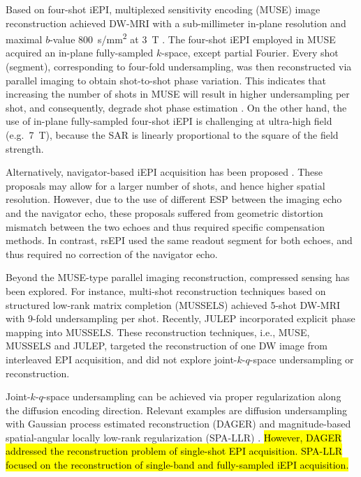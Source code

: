 \documentclass[preprint,12pt,authoryear,review]{elsarticle}
\begin{document}
    Based on four-shot iEPI,
    multiplexed sensitivity encoding (MUSE) image reconstruction
    achieved DW-MRI with a sub-millimeter in-plane resolution
    and maximal $b$-value \SI{800}{s/mm^2} at \SI{3}{\tesla}
    \citep{chen_2013_muse}.
    The four-shot iEPI employed in MUSE acquired
    an in-plane fully-sampled $k$-space, except partial Fourier.
    Every shot (segment), corresponding to four-fold undersampling,
    was then reconstructed via parallel imaging
    to obtain shot-to-shot phase variation.
    This indicates that increasing the number of shots in MUSE
    will result in higher undersampling per shot,
    and consequently, degrade shot phase estimation \citep{wu_2017_diff}.
    On the other hand, the use of in-plane fully-sampled four-shot iEPI
    is challenging at ultra-high field (e.g.~\SI{7}{\tesla}),
    because the SAR is linearly proportional
    to the square of the field strength.

    Alternatively, navigator-based iEPI acquisition has been proposed
    \citep{jeong_2013_navims,dai_2017_navi,dai_2018_navi}.
    These proposals may allow for a larger number of shots,
    and hence higher spatial resolution.
    However, due to the use of different ESP
    between the imaging echo and the navigator echo,
    these proposals suffered from geometric distortion mismatch
    between the two echoes and thus required specific compensation methods.
    In contrast, rsEPI \citep{porter_2009_resolve,heidemann_2010_resolve7t}
    used the same readout segment for both echoes,
    and thus required no correction of the navigator echo.

    Beyond the MUSE-type parallel imaging reconstruction,
    compressed sensing \citep{lustig_2007_cs,block_2007_cs}
    has been explored.
    For instance, multi-shot reconstruction techniques
    based on structured low-rank matrix completion (MUSSELS)
    \citep{mani_2017_mussels,bilgic_2019_neatr} achieved
    5-shot DW-MRI with 9-fold undersampling per shot.
    Recently, JULEP \citep{dai_2023_julep}
    incorporated explicit phase mapping into MUSSELS.
    These reconstruction techniques, i.e., MUSE, MUSSELS and JULEP,
    targeted the reconstruction of one DW image
    from interleaved EPI acquisition,
    and did not explore joint-$k$-$q$-space undersampling or reconstruction.

    Joint-$k$-$q$-space undersampling can be achieved
    via proper regularization along the diffusion encoding direction.
    Relevant examples are diffusion undersampling
    with Gaussian process estimated reconstruction (DAGER)
    \citep{wu_2019_dager} and
    magnitude-based spatial-angular locally low-rank regularization
    (SPA-LLR) \citep{hu_2020_spa_llr}.
    \hl{However, DAGER addressed the reconstruction problem
    of single-shot EPI acquisition.
    SPA-LLR focused on the reconstruction
    of single-band and fully-sampled iEPI acquisition.}
\end{document}
